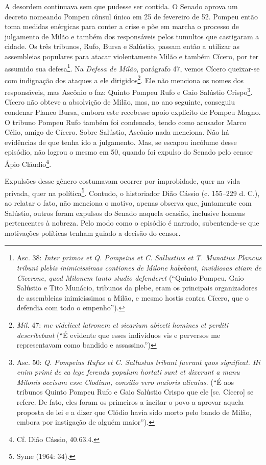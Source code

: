 A desordem continuava sem que pudesse ser contida. O Senado aprova um decreto
nomeando Pompeu cônsul único em 25 de fevereiro de 52.  Pompeu então toma
medidas enérgicas para conter a crise e põe em marcha o processo de julgamento
de Milão e também dos responsáveis pelos tumultos que castigaram a cidade. Os
três tribunos, Rufo, Bursa e Salústio, passam então a utilizar as assembleias
populares para atacar violentamente Milão e também Cícero, por ter assumido sua
defesa\footnote{Asc. 38: \emph{Inter primos et Q. Pompeius et C. Sallustius et
T. Munatius Plancus tribuni plebis inimicissimas contiones de Milone habebant,
invidiosas etiam de Cicerone, quod Milonem tanto studio defenderet} (``Quinto
Pompeu, Gaio Salústio e Tito Munácio, tribunos da plebe, eram os principais
organizadores de assembleias inimicíssimas a  Milão, e mesmo hostis contra
Cícero, que o defendia com todo o empenho'').}. Na \emph{Defesa de Milão},
parágrafo 47, vemos Cícero queixar-se com indignação dos ataques a ele
dirigidos\footnote{\emph{Mil.} 47: \emph{me videlicet latronem et
sicarium abiecti homines et perditi describebant} (``É evidente que esses
indivíduos vis e perversos me representavam como bandido e assassino.'')}. Ele
não menciona os nomes dos responsáveis, mas Ascônio o faz: Quinto Pompeu Rufo e
Gaio Salústio Crispo\footnote{Asc. 50: \emph{Q. Pompeius Rufus et C. Sallustus
tribuni fuerunt quos significat. Hi enim primi de ea lege ferenda populum
hortati sunt et dixerunt a manu Milonis occisum esse Clodium, consilio vero
maioris alicuius}. (``É aos tribunos Quinto Pompeu Rufo e
Gaio Salústio Crispo que ele [sc. Cícero] se refere. De fato, eles foram os primeiros a incitar  o povo a aprovar aquela proposta de lei e a dizer que Clódio havia sido morto pelo
bando de Milão, embora por instigação de alguém maior”).}.  Cícero não obteve a
absolvição de Milão, mas, no ano seguinte, conseguiu condenar Planco Bursa,
embora este recebesse apoio explícito de Pompeu Magno. O tribuno Pompeu Rufo
também foi condenado, tendo como acusador Marco Célio, amigo de Cícero. Sobre
Salústio, Ascônio nada menciona. Não há evidências de que tenha ido a
julgamento. Mas, se escapou incólume desse episódio, não logrou o mesmo em 50,
quando foi expulso do Senado pelo censor Ápio Cláudio\footnote{ Cf. Dião
Cássio, 40.63.4.}. 

Expulsões desse gênero costumavam ocorrer por improbidade, quer na vida
privada, quer na política\footnote{Syme (1964: 34).}. Contudo, o historiador
Dião Cássio (c. 155--229 d. C.), ao relatar o fato, não menciona o motivo,
apenas observa que, juntamente com Salústio, outros foram expulsos do Senado
naquela ocasião, inclusive homens pertencentes à nobreza. Pelo modo como o
episódio é narrado, subentende-se que motivações políticas tenham guiado a
decisão do censor.

